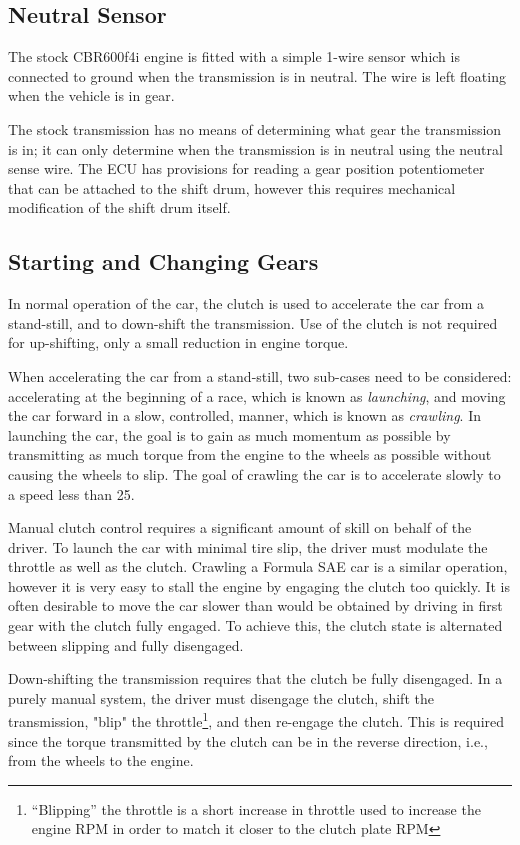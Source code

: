 \subsection{Neutral Sensor}

The stock CBR600f4i engine is fitted with a simple 1-wire sensor which is connected to ground when the transmission is in neutral. The wire is left floating when the vehicle is in gear.

The stock transmission has no means of determining what gear the transmission is in; it can only determine when the transmission is in neutral using the neutral sense wire. The ECU has provisions for reading a gear position potentiometer that can be attached to the shift drum, however this requires mechanical modification of the shift drum itself.

\subsection{Starting and Changing Gears}

In normal operation of the car, the clutch is used to accelerate the car from a stand-still, and to down-shift the transmission. Use of the clutch is not required for up-shifting, only a small reduction in engine torque.

When accelerating the car from a stand-still, two sub-cases need to be considered: accelerating at the beginning of a race, which is known as \emph{launching}, and moving the car forward in a slow, controlled, manner, which is known as \emph{crawling}. In launching the car, the goal is to gain as much momentum as possible by transmitting as much torque from the engine to the wheels as possible without causing the wheels to slip. The goal of crawling the car is to accelerate slowly to a speed less than \unit{25}{\kilo\metre\per\hour}.

Manual clutch control requires a significant amount of skill on behalf of the driver. To launch the car with minimal tire slip, the driver must modulate the throttle as well as the clutch. Crawling a Formula SAE car is a similar operation, however it is very easy to stall the engine by engaging the clutch too quickly. It is often desirable to move the car slower than would be obtained by driving in first gear with the clutch fully engaged. To achieve this, the clutch state is alternated between slipping and fully disengaged.

Down-shifting the transmission requires that the clutch be fully disengaged. In a purely manual system, the driver must disengage the clutch, shift the transmission, "blip" the throttle\footnote{``Blipping'' the throttle is a short increase in throttle used to increase the engine RPM in order to match it closer to the clutch plate RPM}, and then re-engage the clutch. This is required since the torque transmitted by the clutch can be in the reverse direction, i.e., from the wheels to the engine.

